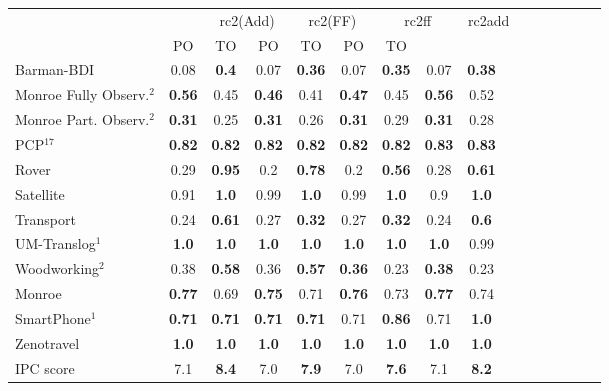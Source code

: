 \begin{tabular}{lccccccccccccccl} 
\toprule 
  && \multicolumn{2}{c}{rc2(Add)} & \multicolumn{2}{c}{rc2(FF)} & \multicolumn{2}{c}{rc2ff} & \multicolumn{2}{c}{rc2add} \\ 
\cmidrule(lr){3-4} \cmidrule(lr){5-6} \cmidrule(lr){7-8} \cmidrule(lr){9-10}  
 &PO & TO & PO & TO & PO & TO  \\ 
\midrule 
Barman-BDI & 0.08 & \textbf{0.4} & 0.07 & \textbf{0.36} & 0.07 & \textbf{0.35} & 0.07 & \textbf{0.38}  \\ 
Monroe Fully Observ.$^{2}$ & \textbf{0.56} & 0.45 & \textbf{0.46} & 0.41 & \textbf{0.47} & 0.45 & \textbf{0.56} & 0.52  \\ 
Monroe Part. Observ.$^{2}$ & \textbf{0.31} & 0.25 & \textbf{0.31} & 0.26 & \textbf{0.31} & 0.29 & \textbf{0.31} & 0.28  \\ 
PCP$^{17}$ & \textbf{0.82} & \textbf{0.82} & \textbf{0.82} & \textbf{0.82} & \textbf{0.82} & \textbf{0.82} & \textbf{0.83} & \textbf{0.83}  \\ 
Rover & 0.29 & \textbf{0.95} & 0.2 & \textbf{0.78} & 0.2 & \textbf{0.56} & 0.28 & \textbf{0.61}  \\ 
Satellite & 0.91 & \textbf{1.0} & 0.99 & \textbf{1.0} & 0.99 & \textbf{1.0} & 0.9 & \textbf{1.0}  \\ 
Transport & 0.24 & \textbf{0.61} & 0.27 & \textbf{0.32} & 0.27 & \textbf{0.32} & 0.24 & \textbf{0.6}  \\ 
UM-Translog$^{1}$ & \textbf{1.0} & \textbf{1.0} & \textbf{1.0} & \textbf{1.0} & \textbf{1.0} & \textbf{1.0} & \textbf{1.0} & 0.99  \\ 
Woodworking$^{2}$ & 0.38 & \textbf{0.58} & 0.36 & \textbf{0.57} & \textbf{0.36} & 0.23 & \textbf{0.38} & 0.23  \\ 
\midrule 
 Monroe & \textbf{0.77} & 0.69 & \textbf{0.75} & 0.71 & \textbf{0.76} & 0.73 & \textbf{0.77} & 0.74  \\ 
SmartPhone$^{1}$ & \textbf{0.71} & \textbf{0.71} & \textbf{0.71} & \textbf{0.71} & 0.71 & \textbf{0.86} & 0.71 & \textbf{1.0}  \\ 
Zenotravel & \textbf{1.0} & \textbf{1.0} & \textbf{1.0} & \textbf{1.0} & \textbf{1.0} & \textbf{1.0} & \textbf{1.0} & \textbf{1.0}  \\ 
\midrule 
 IPC score & 7.1 & \textbf{8.4} & 7.0 & \textbf{7.9} & 7.0 & \textbf{7.6} & 7.1 & \textbf{8.2}  \\ 
\bottomrule 
 \end{tabular} 
